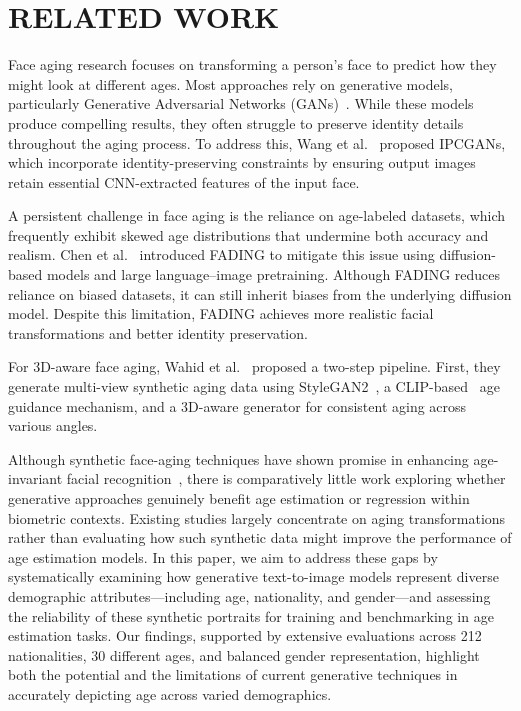 \section{RELATED WORK}
\label{sec:related_work}

Face aging research focuses on transforming a person’s face to predict how they might look at different ages. Most approaches rely on generative models, particularly Generative Adversarial Networks (GANs)~\cite{goodfellow2014}. While these models produce compelling results, they often struggle to preserve identity details throughout the aging process. To address this, Wang et al.~\cite{tang2018} proposed IPCGANs, which incorporate identity-preserving constraints by ensuring output images retain essential CNN-extracted features of the input face.

A persistent challenge in face aging is the reliance on age-labeled datasets, which frequently exhibit skewed age distributions that undermine both accuracy and realism. Chen et al.~\cite{chen2023} introduced FADING to mitigate this issue using diffusion-based models and large language–image pretraining. Although FADING reduces reliance on biased datasets, it can still inherit biases from the underlying diffusion model. Despite this limitation, FADING achieves more realistic facial transformations and better identity preservation.

For 3D-aware face aging, Wahid et al.~\cite{wahid2024} proposed a two-step pipeline. First, they generate multi-view synthetic aging data using StyleGAN2~\cite{Karras2019}, a CLIP-based~\cite{radford2021} age guidance mechanism, and a 3D-aware generator for consistent aging across various angles. 

Although synthetic face-aging techniques have shown promise in enhancing age-invariant facial recognition~\cite{yao2024}, there is comparatively little work exploring whether generative approaches genuinely benefit age estimation or regression within biometric contexts. Existing studies largely concentrate on aging transformations rather than evaluating how such synthetic data might improve the performance of age estimation models. In this paper, we aim to address these gaps by systematically examining how generative text-to-image models represent diverse demographic attributes—including age, nationality, and gender—and assessing the reliability of these synthetic portraits for training and benchmarking in age estimation tasks. Our findings, supported by extensive evaluations across 212 nationalities, 30 different ages, and balanced gender representation, highlight both the potential and the limitations of current generative techniques in accurately depicting age across varied demographics.


